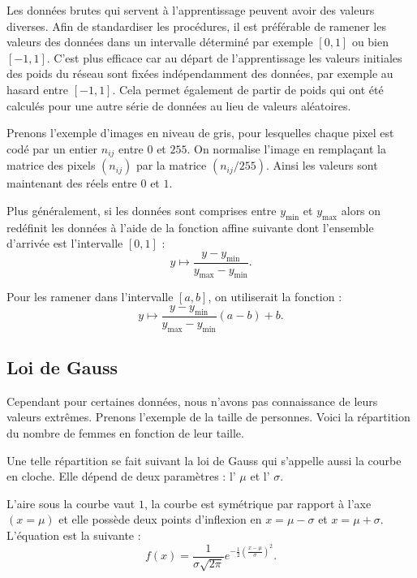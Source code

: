 \documentclass[11pt,class=report,crop=false]{standalone}
\begin{document}
Les données brutes qui servent à l'apprentissage peuvent avoir des valeurs diverses.
Afin de standardiser les procédures, il est préférable de ramener les valeurs des données dans un intervalle déterminé par exemple $[0,1]$ ou bien $[-1,1]$. 
C'est plus efficace car au départ de l'apprentissage les valeurs initiales des poids du réseau sont fixées indépendamment des données, par exemple au hasard entre $[-1,1]$.
Cela permet également de partir de poids qui ont été calculés pour une autre série de données au lieu de valeurs aléatoires.

Prenons l'exemple d'images en niveau de gris, pour lesquelles chaque pixel est codé par un entier $n_{ij}$ entre $0$ et $255$. On \og{}normalise\fg{} l'image en remplaçant la matrice des pixels $(n_{ij})$ par la matrice $(n_{ij}/255)$. Ainsi les valeurs sont maintenant des réels entre $0$ et $1$.


Plus généralement, si les données sont comprises entre $y_{\min}$ et $y_{\max}$ alors on redéfinit les données à l'aide de la fonction affine suivante dont l'ensemble d'arrivée est l'intervalle $[0,1]$ : 
$$y \mapsto \frac{y - y_{\min}}{y_{\max} - y_{\min}}.$$ 

Pour les ramener dans l'intervalle $[a,b]$, on utiliserait la fonction :
$$y \mapsto \frac{y - y_{\min}}{y_{\max} - y_{\min}}(a-b) + b.$$


\subsection{Loi de Gauss}

Cependant pour certaines données, nous n'avons pas connaissance de leurs valeurs extrêmes.
Prenons l'exemple de la taille de personnes. Voici la répartition du nombre de femmes en fonction de leur taille.


Une telle répartition se fait suivant la \og{}loi de Gauss\fg{} qui s'appelle aussi la courbe en cloche. Elle dépend de deux paramètres : l' $\mu$ et l' $\sigma$.

L'aire sous la courbe vaut $1$, la courbe est symétrique par rapport à l'axe $(x=\mu)$ et elle possède deux points d'inflexion en $x=\mu-\sigma$ et $x=\mu+\sigma$.
L'équation est la suivante :
$$f(x) = \frac{1}{\sigma\sqrt{2\pi}} e^{-\frac12\left(\frac{x-\mu}{\sigma}\right)^2}.$$
\end{document}

